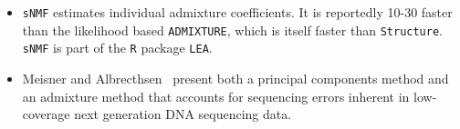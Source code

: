 \documentclass[12pt]{article}
\begin{document}
\begin{itemize}

\item {\tt sNMF} estimates individual admixture coefficients. It is
  reportedly 10-30 faster than the likelihood based {\tt ADMIXTURE},
  which is itself faster than {\tt Structure}. {\tt sNMF} is part of
  the {\tt R} package {\tt LEA}.

\item Meisner and Albrecthsen~\cite{Meisner-Albrechtsen-2018} present
  both a principal components method and an admixture method that
  accounts for sequencing errors inherent in low-coverage next
  generation DNA sequencing data.

\end{itemize}




\ccLicense
\end{document}
